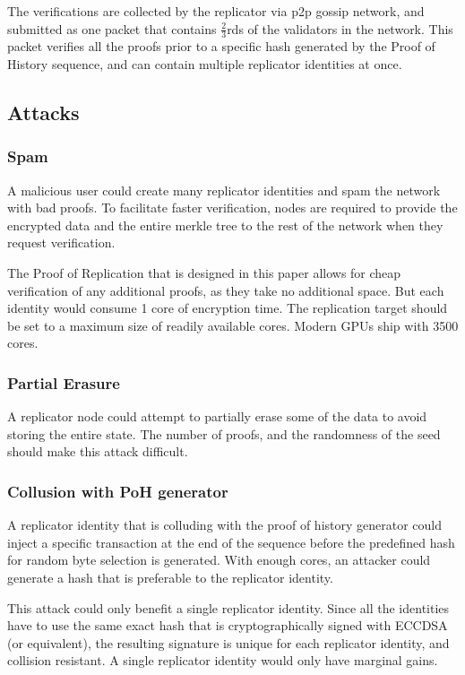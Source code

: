 \documentclass[12pt]{article}
\begin{document}
The verifications are collected by the replicator via p2p gossip network, and submitted as one packet that contains \(\frac{2}{3}\)rds of the validators in the network.  This packet verifies all the proofs prior to a specific hash generated by the Proof of History sequence, and can contain multiple replicator identities at once.
\subsection{Attacks}
\subsubsection{Spam}
A malicious user could create many replicator identities and spam the network with bad proofs.  To facilitate faster verification, nodes are required to provide the encrypted data and the entire merkle tree to the rest of the network when they request verification.

The Proof of Replication that is designed in this paper allows for cheap verification of any additional proofs, as they take no additional space.  But each identity would consume 1 core of encryption time.  The replication target should be set to a maximum size of readily available cores.  Modern GPUs ship with 3500 cores.

\subsubsection{Partial Erasure}

A replicator node could attempt to partially erase some of the data to avoid storing the entire state.  The number of proofs, and the randomness of the seed should make this attack difficult.

\subsubsection{Collusion with PoH generator}

A replicator identity that is colluding with the proof of history generator could inject a specific transaction at the end of the sequence before the predefined hash for random byte selection is generated.  With enough cores, an attacker could generate a hash that is preferable to the replicator identity.

This attack could only benefit a single replicator identity.  Since all the identities have to use the same exact hash that is cryptographically signed with ECCDSA (or equivalent), the resulting signature is unique for each replicator identity, and collision resistant.  A single replicator identity would only have marginal gains.
\end{document}
